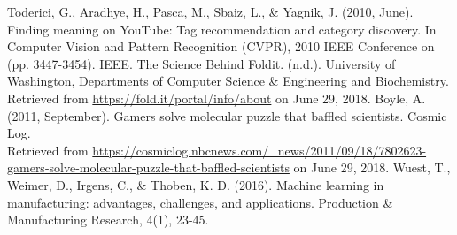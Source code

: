 \documentclass[conference]{IEEEtran}
\begin{document}
\begin{thebibliography}{1}
    Toderici, G., Aradhye, H., Pasca, M., Sbaiz, L., \& Yagnik, J. (2010, June). Finding meaning on YouTube: Tag recommendation and category discovery. In Computer Vision and Pattern Recognition (CVPR), 2010 IEEE Conference on (pp. 3447-3454). IEEE.
    The Science Behind Foldit. (n.d.). University of Washington, Departments of Computer Science \& Engineering and Biochemistry. Retrieved from \url{https://fold.it/portal/info/about} on June 29, 2018. 
    Boyle, A. (2011, September). Gamers solve molecular puzzle that baffled scientists. Cosmic Log.\\
    Retrieved from \url{https://cosmiclog.nbcnews.com/_news/2011/09/18/7802623-gamers-solve-molecular-puzzle-that-baffled-scientists} on June 29, 2018.
    Wuest, T., Weimer, D., Irgens, C., \& Thoben, K. D. (2016). Machine learning in manufacturing: advantages, challenges, and applications. Production \& Manufacturing Research, 4(1), 23-45.
\end{thebibliography}
\end{document}
